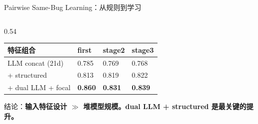 \documentclass[aspectratio=169,UTF8]{ctexbeamer}
\newcommand{\key}[1]{\textcolor{ICCADBlue}{\textbf{#1}}}
\newcommand{\good}[1]{\textcolor{ICCADGreen}{\textbf{#1}}}
\begin{document}
\begin{frame}{Pairwise Same-Bug Learning：从规则到学习}
\begin{columns}[T]
\begin{column}{0.54\textwidth}
      \vspace{1mm}
      \begin{tabularx}{\linewidth}{p{2.8cm}p{1.5cm}p{1.5cm}p{1.5cm}}
        \toprule
        \textbf{特征组合} & \textbf{first} & \textbf{stage2} & \textbf{stage3} \\
        \midrule
        LLM concat (21d) & 0.785 & 0.769 & 0.768 \\
        + structured & 0.813 & 0.819 & 0.822 \\
        + dual LLM + focal & \good{0.860} & \good{0.831} & \good{0.839} \\
        \bottomrule
      \end{tabularx}
      \vspace{2mm}
      \normalsize
      结论：\key{输入特征设计 $\gg$ 堆模型规模。dual LLM + structured 是最关键的提升。}
    \end{column}
  \end{columns}
\end{frame}
\end{document}

